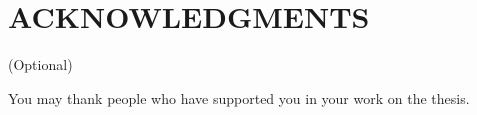 \chapter*{ACKNOWLEDGMENTS}
(Optional)

You may thank people who have supported you in your work on the thesis.